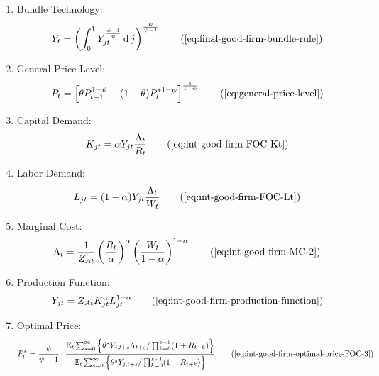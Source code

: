 \documentclass[
thesis.tex
]{subfiles}
\begin{document}
{\begin{itemize}
\begin{enumerate}
				\item Bundle Technology:
				\begin{align}
					Y_t = \left( \int_{0}^{1} Y_{jt}^{\frac{\psi-1}{\psi}} \dif j \right)^{\frac{\psi}{\psi-1}}
					\tag{\ref{eq:final-good-firm-bundle-rule}}
				\end{align}
				
				\item General Price Level:
				\begin{align}
					P_t = \left[ \theta P_{t-1}^{1-\psi} + (1-\theta) P_t^{\ast 1-\psi} \right]^\frac{1}{1-\psi}
					\tag{\ref{eq:general-price-level}}
				\end{align}
				
				\item Capital Demand:
				\begin{align}
					K_{jt} = \alpha Y_{jt} \frac{\Lambda_t}{R_t}
					\tag{\ref{eq:int-good-firm-FOC-Kt}}
				\end{align}
				
				\item Labor Demand:
				\begin{align}
					L_{jt} = (1-\alpha) Y_{jt} \frac{\Lambda_t}{W_t}
					\tag{\ref{eq:int-good-firm-FOC-Lt}}
				\end{align}
				
				
				\item Marginal Cost:
				\begin{align}
					\Lambda_t = \frac{1}{Z_{At}} \left( \frac{R_t}{\alpha} \right)^{\alpha} \left( \frac{W_t}{1-\alpha} \right)^{1-\alpha}
					\tag{\ref{eq:int-good-firm-MC-2}}
				\end{align}
				
				\item Production Function:
				\begin{align}
					Y_{jt} = Z_{At} K_{jt}^\alpha L_{jt}^{1-\alpha}
					\tag{\ref{eq:int-good-firm-production-function}}
				\end{align}
				
				\item Optimal Price:
				\begin{align}
					P_t^\ast = \frac{\psi}{\psi-1} \cdot \frac{ \E \sum_{s=0}^{\infty} \left\{ \theta^s Y_{j,t+s} \Lambda_{t+s} / \prod_{k=0}^{s-1}(1+R_{t+k}) \right\} } {\E \sum_{s=0}^{\infty} \left\{ \theta^s Y_{j,t+s} / \prod_{k=0}^{s-1}(1 + R_{t+k}) \right\}} \tag{\ref{eq:int-good-firm-optimal-price-FOC-3}}
				\end{align}
				

\end{enumerate}
\end{itemize}}
\end{document}
